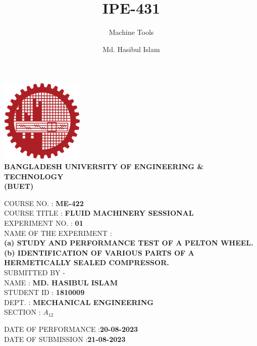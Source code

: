\documentclass[14pt]{article}
\title{IPE-431}
\author{Md. Hasibul Islam}
\subtitle{Machine Tools}
\date{}
\begin{document}
\begin{titlepage}
    \centering
    \includegraphics[width=4cm]{institution_logo.jpg}\\
    \vspace*{1cm}
    \textbf{\MakeTextUppercase{Bangladesh University of Engineering \& Technology}} \\

    \textbf{\MakeTextUppercase{(BUET)}} \\
    \vspace*{2cm}
    \raggedright
    \MakeTextUppercase{Course No.} : \textbf{ME-422}\\
    \vspace*{0.5cm}
    \MakeTextUppercase{Course Title} : \textbf{FLUID MACHINERY SESSIONAL} \\ 
    \vspace*{1cm}
    \MakeTextUppercase{Experiment No.} : \textbf{01} \\
    \vspace*{0.5cm}
    \MakeTextUppercase{Name of the Experiment} :  \\
    \textbf{ (a) STUDY AND PERFORMANCE TEST OF A PELTON WHEEL.}\\
    \textbf{ (b) IDENTIFICATION OF VARIOUS PARTS OF A HERMETICALLY SEALED COMPRESSOR.} \\

    \vspace*{2.5cm} 
    \MakeTextUppercase{Submitted By -} \\
    \vspace*{0.5cm}
    \MakeTextUppercase{Name}        : \hspace{2cm}\textbf{MD. HASIBUL ISLAM} \\
    \vspace*{0.5cm}
    \MakeTextUppercase{Student id}  : \hspace{1cm}\textbf{1810009} \\
    \vspace*{0.5cm}
    \MakeTextUppercase{Dept.}       : \hspace{2cm}\textbf{MECHANICAL ENGINEERING} \\
    \vspace*{0.5cm}
    \MakeTextUppercase{section}     : \hspace{1.5cm}\textbf{$A_{12}$} \\

    \vspace*{2cm}

    \MakeTextUppercase{Date of Performance}     :\hspace{1.5cm}\textbf{20-08-2023}\\
    \vspace*{0.5cm}
    \MakeTextUppercase{Date of Submission}      :\hspace{2cm}\textbf{21-08-2023}\\

    \vfill
\end{titlepage}
\end{document}
